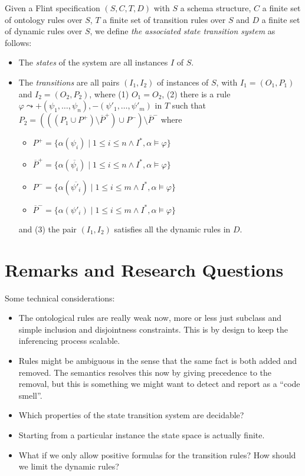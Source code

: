 \documentclass[11pt]{amsart}
\newcommand{\flint}{{\sc Flint}}
\begin{document}
Given a \flint{} specification $(S, C, T, D)$ with $S$ a schema structure, $C$ a finite set of ontology rules over $S$, $T$ a finite set of transition rules over $S$ and $D$ a finite set of dynamic rules over $S$, we define \emph{the associated state transition system} as follows:
\begin{itemize}

  \item The \emph{states} of the system are all instances $I$ of $S$.
  
  \item The \emph{transitions} are all pairs  $(I_1, I_2)$ of instances of $S$, with $I_1= (O_1, P_1) $ and $I_2 = (O_2, P_2)$, where (1) $O_1 = O_2$, (2) there is a  rule $\varphi \leadsto +(\psi_1, \ldots, \psi_n), -(\psi'_1, \ldots, \psi'_m)$ in $T$ such that $P_2 = (((P_1 \cup P^+) \setminus \overline{P}^+) \cup P^- ) \setminus \overline{P}^-$ where
       \begin{itemize}
     \item  $P^+ = \{ \alpha(\psi_i) \mid {1 \leq i \leq n} \wedge {I^*, \alpha \models \varphi} \}$
     \item $\overline{P}^+ =  \{ \alpha(\overline{\psi_i}) \mid {1 \leq i \leq n} \wedge {I^*, \alpha \models \varphi} \}$
     \item  $P^- = \{ \alpha(\overline{\psi'_i}) \mid {1 \leq i \leq m} \wedge {I^*, \alpha \models \varphi} \}$
     \item $\overline{P}^- =  \{ \alpha({\psi'_i}) \mid {1 \leq i \leq m} \wedge {I^*, \alpha \models \varphi} \}$
       \end{itemize}
   and (3) the pair $(I_1, I_2)$ satisfies all the dynamic rules in $D$.
 \end{itemize}


\section{Remarks and Research Questions}

Some technical considerations:

\begin{itemize}

\item The ontological rules are really weak now, more or less just subclass and simple inclusion and disjointness constraints. This is by design to keep the inferencing process scalable.

\item Rules might be ambiguous in the sense that the same fact is both added and removed. The semantics resolves this now by giving precedence to the removal, but this is something we might want to detect and report as a ``code smell''.

\item Which properties of the state transition system are decidable?

\item Starting from a particular instance the state space is actually finite.

\item What if we only allow positive formulas for the transition rules? How should we limit the dynamic rules? 

\end{itemize}
\end{document}

